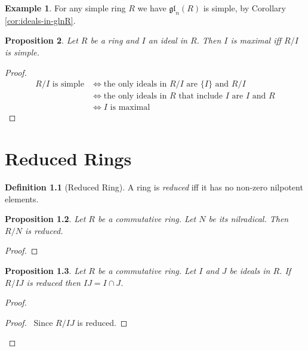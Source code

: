 \documentclass{book}
\let\qed\relax
\newtheorem{prop}{Proposition}[chapter]
\theoremstyle{definition}
\newtheorem{df}[prop]{Definition}
\newtheorem{ex}[prop]{Example}
\newcommand{\gl}[2]{\ensuremath{\mathfrak{gl}_{#1} \left( {#2} \right)}}
\begin{document}
\begin{ex}
For any simple ring $R$ we have $\gl{n}{R}$ is simple, by Corollary \ref{cor:ideals-in-glnR}.
\end{ex}

\begin{prop}
\label{prop:maximal-iff-quotient-simple}
Let $R$ be a ring and $I$ an ideal in $R$. Then $I$ is maximal iff $R/I$ is simple.
\end{prop}

\begin{proof}
\pf
\begin{align*}
R / I \text{ is simple}
& \Leftrightarrow \text{the only ideals in } R / I \text{ are } \{I\} \text{ and } R / I \\
& \Leftrightarrow \text{the only ideals in } R \text{ that include } I \text{ are } I \text{ and } R \\
& \Leftrightarrow I \text{ is maximal}
\end{align*}
\qed
\end{proof}

\chapter{Reduced Rings}

\begin{df}[Reduced Ring]
A ring is \emph{reduced} iff it has no non-zero nilpotent elements.
\end{df}

\begin{prop}
Let $R$ be a commutative ring. Let $N$ be its nilradical. Then $R/N$ is reduced.
\end{prop}

\begin{proof}
\pf
{}
\qed
\end{proof}

\begin{prop}
Let $R$ be a commutative ring. Let $I$ and $J$ be ideals in $R$. If $R/IJ$ is reduced then $IJ = I \cap J$.
\end{prop}

\begin{proof}
\pf
{}
\begin{proof}
	\pf\ Since $R/IJ$ is reduced.
\end{proof}
\qed
\end{proof}
\end{document}
